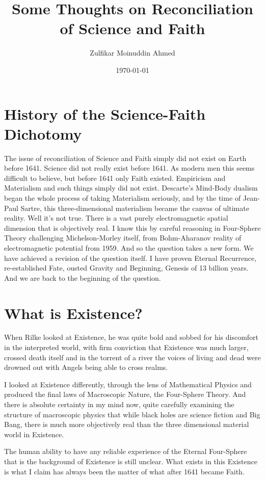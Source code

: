 \documentclass{amsart}
\title{Some Thoughts on Reconciliation of Science and Faith}
\author{Zulfikar Moinuddin Ahmed}
\date{\today}
\begin{document}
\maketitle

\section{History of the Science-Faith Dichotomy}

The issue of reconciliation of Science and Faith simply did not exist on Earth before 1641.  Science did not really exist before 1641.  As modern men this seems difficult to believe, but before 1641 only Faith existed.  Empiricism and Materialism and such things simply did not exist.  Descarte's Mind-Body dualism began the whole process of taking Materialism seriously, and by the time of Jean-Paul Sartre, this three-dimensional materialism became the canvas of ultimate reality.  Well it's not true.  There is a vast purely electromagnetic spatial dimension that is objectively real.  I know this by careful reasoning in Four-Sphere Theory challenging Michelson-Morley itself, from Bohm-Aharanov reality of electromagnetic potential from 1959.  And so the question takes a new form.  We have achieved a revision of the question itself.  I have proven Eternal Recurrence, re-established Fate, ousted Gravity and Beginning, Genesis of 13 billion years.  And we are back to the beginning of the question.

\section{What is Existence?}
When Rilke looked at Existence, he was quite bold and sobbed for his discomfort in the interpreted world, with firm conviction that Existence was much larger, crossed death itself and in the torrent of a river the voices of living and dead were drowned out with Angels being able to cross realms.  

I looked at Existence differently, through the lens of Mathematical Physics and produced the final laws of Macroscopic Nature, the Four-Sphere Theory.  And there is absolute certainty in my mind now, quite carefully examining the structure of macroscopic physics that while black holes are science fiction and Big Bang, there is much more objectively real than the three dimensional material world in Existence.  

The human ability to have any reliable experience of the Eternal Four-Sphere that is the background of Existence is still unclear.  What exists in this Existence is what I claim has always been the matter of what after 1641 became Faith.  
\end{document}
